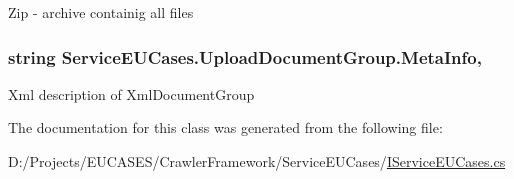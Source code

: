 Zip -\/ archive containig all files 

\hypertarget{class_service_e_u_cases_1_1_upload_document_group_ac4030d13aa3513aecf5296ada4cd7b85}{
\subsubsection[{Meta\-Info}]{\setlength{\rightskip}{0pt plus 5cm}string Service\-E\-U\-Cases.\-Upload\-Document\-Group.\-Meta\-Info\hspace{0.3cm}{\ttfamily [get]}, {\ttfamily [set]}}}\label{class_service_e_u_cases_1_1_upload_document_group_ac4030d13aa3513aecf5296ada4cd7b85}


Xml description of Xml\-Document\-Group 



The documentation for this class was generated from the following file\-:\begin{DoxyCompactItemize}
\item 
D\-:/\-Projects/\-E\-U\-C\-A\-S\-E\-S/\-Crawler\-Framework/\-Service\-E\-U\-Cases/\hyperlink{_i_service_e_u_cases_8cs}{I\-Service\-E\-U\-Cases.\-cs}\end{DoxyCompactItemize}
